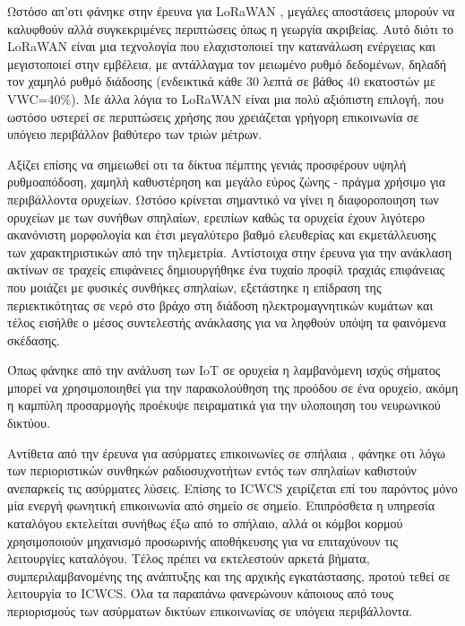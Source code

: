     Ωστόσο απ'οτι φάνηκε στην έρευνα για LoRaWAN \cite{zhao_feasibility_2023}, μεγάλες 
    αποστάσεις μπορούν να καλυφθούν αλλά συγκεκριμένες περιπτώσεις όπως η γεωργία ακριβείας.
    Αυτό διότι το LoRaWAN είναι μια τεχνολογία που ελαχιστοποιεί την κατανάλωση ενέργειας και
    μεγιστοποιεί στην εμβέλεια, με αντάλλαγμα τον μειωμένο ρυθμό δεδομένων, δηλαδή τον χαμηλό
    ρυθμό διάδοσης (ενδεικτικά κάθε 30 λεπτά σε βάθος 40 εκατοστών με VWC=40\%). Με άλλα
    λόγια το LoRaWAN είναι μια πολύ αξιόπιστη επιλογή, που ωστόσο υστερεί σε περιπτώσεις 
    χρήσης που χρειάζεται γρήγορη επικοινωνία σε υπόγειο περιβάλλον βαθύτερο των τριών μέτρων.

    Αξίζει επίσης να σημειωθεί οτι τα δίκτυα πέμπτης γενιάς προσφέρουν υψηλή ρυθμοαπόδοση,
    χαμηλή καθυστέρηση και μεγάλο εύρος ζώνης - πράγμα χρήσιμο για περιβάλλοντα ορυχείων.
    Ωστόσο κρίνεται σημαντικό να γίνει η διαφοροποιηση των ορυχείων με των συνήθων σπηλαίων,
    ερειπίων καθώς τα ορυχεία έχουν λιγότερο ακανόνιστη μορφολογία και έτσι μεγαλύτερο βαθμό
    ελευθερίας και εκμετάλλευσης των χαρακτηριστικών από την τηλεμετρία. Αντίστοιχα στην έρευνα
    για την ανάκλαση ακτίνων σε τραχείς επιφάνειες \cite{soo_investigation_2018} δημιουργήθηκε
    ένα τυχαίο προφίλ τραχιάς επιφάνειας που μοιάζει με φυσικές συνθήκες σπηλαίων, εξετάστηκε
    η επίδραση της περιεκτικότητας σε νερό στο βράχο στη διάδοση ηλεκτρομαγνητικών κυμάτων και
    τέλος εισήλθε ο μέσος συντελεστής ανάκλασης για να ληφθούν υπόψη τα φαινόμενα σκέδασης.

    Όπως φάνηκε από την ανάλυση των IoT σε ορυχεία \cite{ming_study_2019} η λαμβανόμενη ισχύς
    σήματος μπορεί να χρησιμοποιηθεί για την παρακολούθηση της προόδου σε ένα ορυχείο, ακόμη 
    η καμπύλη προσαρμογής προέκυψε πειραματικά για την υλοποιηση του νευρωνικού δικτύου.

    Αντίθετα από την έρευνα για ασύρματες επικοινωνίες σε σπήλαια \cite{yavuz_-cave_2009},
    φάνηκε οτι λόγω των περιοριστικών συνθηκών ραδιοσυχνοτήτων εντός των σπηλαίων καθιστούν
    ανεπαρκείς τις ασύρματες λύσεις. Επίσης το ICWCS χειρίζεται επί του παρόντος μόνο μία
    ενεργή φωνητική επικοινωνία από σημείο σε σημείο. Επιπρόσθετα η υπηρεσία καταλόγου
    εκτελείται συνήθως έξω από το σπήλαιο, αλλά οι κόμβοι κορμού χρησιμοποιούν μηχανισμό
    προσωρινής αποθήκευσης για να επιταχύνουν τις λειτουργίες καταλόγου. Τέλος πρέπει να
    εκτελεστούν αρκετά βήματα, συμπεριλαμβανομένης της ανάπτυξης και της αρχικής εγκατάστασης,
    προτού τεθεί σε λειτουργία το ICWCS. Όλα τα παραπάνω φανερώνουν κάποιους από τους
    περιορισμούς των ασύρματων δικτύων επικοινωνίας σε υπόγεια περιβάλλοντα.

